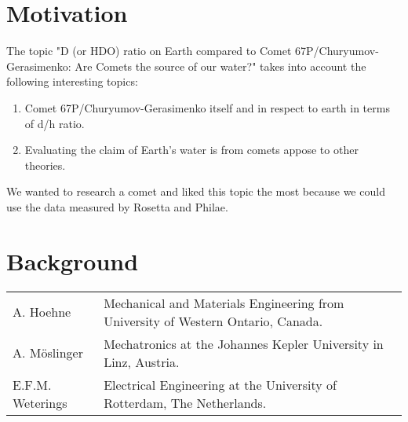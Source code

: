 \documentclass[11pt]{article}
\begin{document}


\section{Motivation}
The topic "D (or HDO) ratio on Earth compared to Comet 67P/Churyumov-Gerasimenko: Are Comets the source of our water?" takes into account the following interesting topics:

\begin{enumerate}
	\item Comet 67P/Churyumov-Gerasimenko itself and in respect to earth in terms of d/h ratio.
	\item Evaluating the claim of Earth's water is from comets appose to other theories.
\end{enumerate}

We wanted to research a comet and liked this topic the most because we could use the data measured by Rosetta and Philae. 


\section{Background}
\begin{tabular}{l l}
A. Hoehne & Mechanical and Materials Engineering from University of Western Ontario, Canada.\\
A. M\"{o}slinger & Mechatronics at the Johannes Kepler University in Linz, Austria.\\
E.F.M. Weterings & Electrical Engineering at the University of Rotterdam, The Netherlands.
\end{tabular}
\end{document}

